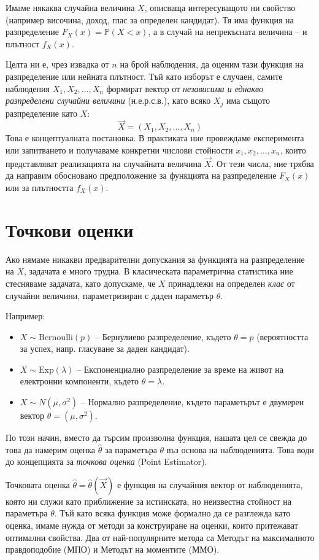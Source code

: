 \documentclass{article}
\begin{document}
Имаме някаква случайна величина $X$, описваща интересуващото ни свойство (например височина, доход, глас за определен кандидат). Тя има функция на разпределение $F_X(x) = \mathbb{P}(X < x)$, а в случай на непрекъсната величина -- и плътност $f_X(x)$.

Целта ни е, чрез извадка от $n$ на брой наблюдения, да оценим тази функция на разпределение или нейната плътност. Тъй като изборът е случаен, самите наблюдения $X_1, X_2, \dots, X_n$ формират вектор от \emph{независими и еднакво разпределени случайни величини} (н.е.р.с.в.), като всяко $X_j$ има същото разпределение като $X$:
\[
    \vec{X} = (X_1, X_2, \dots, X_n)
\]
Това е концептуалната постановка. В практиката ние провеждаме експеримента или запитването и получаваме конкретни числови стойности $x_1, x_2, \dots, x_n$, които представляват реализацията на случайната величина $\vec{X}$. От тези числа, ние трябва да направим обосновано предположение за функцията на разпределение $F_X(x)$ или за плътността $f_X(x)$.

\section{Точкови оценки}

Ако нямаме никакви предварителни допускания за функцията на разпределение на $X$, задачата е много трудна. В класическата параметрична статистика ние стесняваме задачата, като допускаме, че $X$ принадлежи на определен \emph{клас} от случайни величини, параметризиран с даден параметър $\theta$.

Например:
\begin{itemize}
    \item $X \sim \text{Bernoulli}(p)$ -- Бернулиево разпределение, където $\theta = p$ (вероятността за успех, напр. гласуване за даден кандидат).
    \item $X \sim \text{Exp}(\lambda)$ -- Експоненциално разпределение за време на живот на електронни компоненти, където $\theta = \lambda$.
    \item $X \sim N(\mu, \sigma^2)$ -- Нормално разпределение, където параметьрът е двумерен вектор $\theta = (\mu, \sigma^2)$.
\end{itemize}

По този начин, вместо да търсим произволна функция, нашата цел се свежда до това да намерим оценка $\hat{\theta}$ за параметъра $\theta$ въз основа на наблюденията. Това води до концепцията за \emph{точкова оценка} (Point Estimator). 

Точковата оценка $\hat{\theta} = \hat{\theta}(\vec{X})$ е функция на случайния вектор от наблюденията, която ни служи като приближение за истинската, но неизвестна стойност на параметъра $\theta$. Тъй като всяка функция може формално да се разглежда като оценка, имаме нужда от методи за конструиране на оценки, които притежават оптимални свойства. Два от най-популярните метода са Методът на максималното правдоподобие (МПО) и Методът на моментите (ММО).
\end{document}
